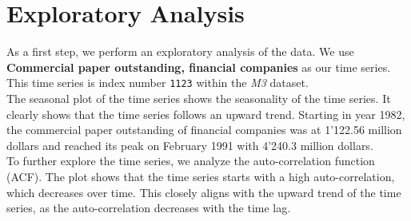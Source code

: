 \section{Exploratory Analysis}\label{sec:exploratory-analysis}

As a first step, we perform an exploratory analysis of the data.
We use \textbf{Commercial paper outstanding, financial companies} as our time series.
This time series is index number \texttt{1123} within the \textit{M3} dataset.\\

The seasonal plot of the time series shows the seasonality of the time series.
It clearly shows that the time series follows an upward trend.
Starting in year 1982, the commercial paper outstanding of financial companies was at 1'122.56 million dollars
and reached its peak on February 1991 with 4'240.3 million dollars.\\

To further explore the time series, we analyze the auto-correlation function (ACF).
The plot shows that the time series starts with a high auto-correlation, which decreases over time.
This closely aligns with the upward trend of the time series, as the auto-correlation decreases with the time lag.\\
